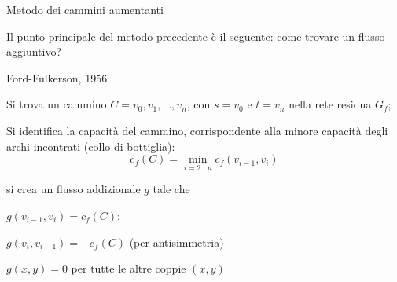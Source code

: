 \begin{frame}{Metodo dei cammini aumentanti}

\vspace{-9pt}
Il punto principale del metodo precedente è il seguente: come trovare un 
flusso aggiuntivo? 

\begin{center}
\end{center}

\end{frame}

\begin{frame}{Ford-Fulkerson, 1956}

\vspace{-9pt}
\begin{overprint}
\BIL
\item Si trova un cammino $C=v_0,v_1,\ldots,v_n$, con $s=v_0$ e $t=v_n$ 
  nella rete residua $G_f$; 
\item Si identifica la \alert{capacità del cammino}, corrispondente
  alla minore capacità degli archi incontrati (collo di bottiglia):
  \[
    c_f(C) = \min_{i=2 \ldots n} c_f(v_{i-1},v_i)
  \]
\EIL
{}
\BIL
\item si crea un flusso addizionale $g$ tale che 
  \BI
  \item $g(v_{i-1}, v_i) = c_f(C)$;
  \item $g(v_i,v_{i-1}) = -c_f(C)$ (per antisimmetria)
  \item $g(x,y)=0$ per tutte le altre coppie $(x,y)$
  \EI
\EIL
\end{overprint}

\medskip
\begin{overprint}
\begin{center}
\end{center}
\begin{center}
\end{center}
\end{overprint}



\end{frame}

